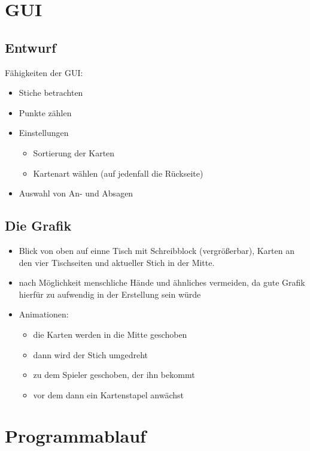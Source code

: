 \documentclass[12pt,a4paper]{article}
\begin{document}
\section{GUI}
\subsection{Entwurf}
Fähigkeiten der GUI:
\begin{itemize}
\item Stiche betrachten
\item Punkte zählen
\item Einstellungen
\begin{itemize}
\item Sortierung der Karten
\item Kartenart wählen (auf jedenfall die Rückseite)
\end{itemize}
\item Auswahl von An- und Absagen
\end{itemize}
\subsection{Die Grafik}
\begin{itemize}
\item Blick von oben auf einne Tisch mit Schreibblock (vergrößerbar), Karten an den vier Tischseiten und aktueller Stich
in der Mitte.
\item nach Möglichkeit menschliche Hände und ähnliches vermeiden, da gute Grafik hierfür zu aufwendig in der Erstellung sein würde
\item Animationen:
\begin{itemize}
\item die Karten werden in die Mitte geschoben
\item dann wird der Stich umgedreht
\item zu dem Spieler geschoben, der ihn bekommt
\item vor dem dann ein Kartenstapel anwächst
\end{itemize}
\end{itemize}
\newpage
\section{Programmablauf}
\end{document}
